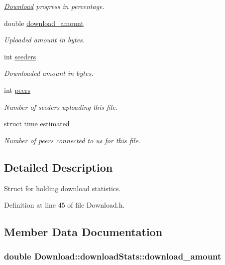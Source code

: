 \begin{DoxyCompactItemize}
\begin{DoxyCompactList}\small\item\em \hyperlink{classDownload}{Download} progress in percentage. \end{DoxyCompactList}\item 
double \hyperlink{structDownload_1_1downloadStats_a0f0f766c97e7757403bc47991607bedc}{download\_\-amount}
\begin{DoxyCompactList}\small\item\em Uploaded amount in bytes. \end{DoxyCompactList}\item 
int \hyperlink{structDownload_1_1downloadStats_a9cef090f561bf611087b9cec57406a03}{seeders}
\begin{DoxyCompactList}\small\item\em Downloaded amount in bytes. \end{DoxyCompactList}\item 
int \hyperlink{structDownload_1_1downloadStats_a7b26668ee9f9a4233ebcb8ac9254ab29}{peers}
\begin{DoxyCompactList}\small\item\em Number of seeders uploading this file. \end{DoxyCompactList}\item 
struct \hyperlink{structDownload_1_1time}{time} \hyperlink{structDownload_1_1downloadStats_aa3e1fb3093ef07283b62d37322594b97}{estimated}
\begin{DoxyCompactList}\small\item\em Number of peers connected to us for this file. \end{DoxyCompactList}\end{DoxyCompactItemize}


\subsection{Detailed Description}
Struct for holding download statistics. 

Definition at line 45 of file Download.h.



\subsection{Member Data Documentation}
\hypertarget{structDownload_1_1downloadStats_a0f0f766c97e7757403bc47991607bedc}{
\subsubsection[{download\_\-amount}]{\setlength{\rightskip}{0pt plus 5cm}double {\bf Download::downloadStats::download\_\-amount}}}
\label{structDownload_1_1downloadStats_a0f0f766c97e7757403bc47991607bedc}


